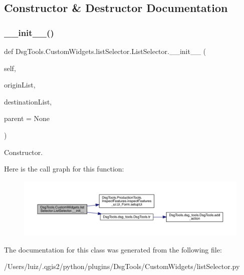 \subsection{Constructor \& Destructor Documentation}
\mbox{\label{class_dsg_tools_1_1_custom_widgets_1_1list_selector_1_1_list_selector_a6d5400e462b4218203dc18f41b2ecbf4}} 
\subsubsection{\texorpdfstring{\+\_\+\+\_\+init\+\_\+\+\_\+()}{\_\_init\_\_()}}
{\footnotesize\ttfamily def Dsg\+Tools.\+Custom\+Widgets.\+list\+Selector.\+List\+Selector.\+\_\+\+\_\+init\+\_\+\+\_\+ (\begin{DoxyParamCaption}\item[{}]{self,  }\item[{}]{origin\+List,  }\item[{}]{destination\+List,  }\item[{}]{parent = {\ttfamily None} }\end{DoxyParamCaption})}

\begin{DoxyVerb}Constructor.\end{DoxyVerb}
 Here is the call graph for this function\+:
\nopagebreak
\begin{figure}[H]
\begin{center}
\leavevmode
\includegraphics[width=350pt]{class_dsg_tools_1_1_custom_widgets_1_1list_selector_1_1_list_selector_a6d5400e462b4218203dc18f41b2ecbf4_cgraph}
\end{center}
\end{figure}


The documentation for this class was generated from the following file\+:\begin{DoxyCompactItemize}
\item 
/\+Users/luiz/.\+qgis2/python/plugins/\+Dsg\+Tools/\+Custom\+Widgets/list\+Selector.\+py\end{DoxyCompactItemize}
